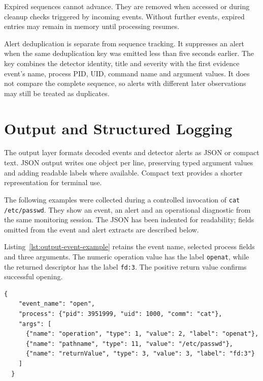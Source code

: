 Expired sequences cannot advance. They are removed when accessed or during
cleanup checks triggered by incoming events. Without further events,
expired entries may remain in memory until processing resumes.

Alert deduplication is separate from sequence tracking. It suppresses an
alert when the same deduplication key was emitted less than five seconds
earlier. The key combines the detector identity, title and severity with
the first evidence event's name, process PID, UID, command name and argument
values. It does not compare the complete sequence, so alerts with different
later observations may still be treated as duplicates.

\section{Output and Structured Logging}
  \label{sec:implementation-output-logging}

  The output layer formats decoded events and detector alerts as JSON or compact
  text. JSON output writes one object per line, preserving typed argument values
  and adding readable labels where available. Compact text provides a shorter
  representation for terminal use.

  The following examples were collected during a controlled invocation of
  \texttt{cat /etc/passwd}. They show an event, an alert and an operational
  diagnostic from the same monitoring session. The JSON has been indented for
  readability; fields omitted from the event and alert extracts are described below.

  Listing~\ref{lst:output-event-example} retains the event name, selected process
  fields and three arguments. The numeric operation value has the label
  \texttt{openat}, while the returned descriptor has the label \texttt{fd:3}.
  The positive return value confirms successful opening.

  \begin{lstlisting}[language={},
      caption={Selected fields from the recorded file-opening event.},
      label={lst:output-event-example}]
  {
    "event_name": "open",
    "process": {"pid": 3951999, "uid": 1000, "comm": "cat"},
    "args": [
      {"name": "operation", "type": 1, "value": 2, "label": "openat"},
      {"name": "pathname", "type": 11, "value": "/etc/passwd"},
      {"name": "returnValue", "type": 3, "value": 3, "label": "fd:3"}
    ]
  }
  \end{lstlisting}


